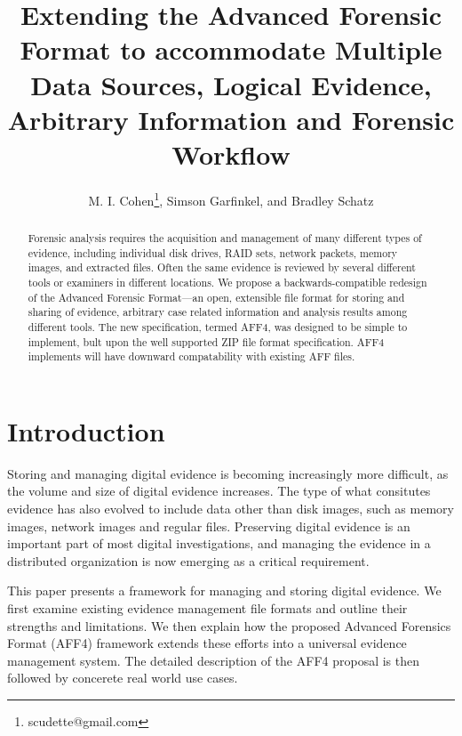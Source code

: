 \documentclass[10pt, conference]{IEEEtran}
\begin{document}
\title{Extending the Advanced Forensic Format to accommodate Multiple
  Data Sources, Logical Evidence, Arbitrary Information and Forensic Workflow}
\author{M. I. Cohen\footnote{scudette@gmail.com}, Simson Garfinkel, and Bradley Schatz}
\maketitle

\begin{abstract}
Forensic analysis requires the acquisition and management of many
different types of evidence, including individual disk drives, RAID
sets, network packets, memory images, and extracted files. Often the
same evidence is reviewed by several different tools or examiners in
different locations. We propose a backwards-compatible redesign of the
Advanced Forensic Format---an open, extensible file format for storing
and sharing of evidence, arbitrary case related information and
analysis results among different tools. The new specification, termed
AFF4, was designed to be simple to implement, bult upon the well
supported ZIP file format specification. AFF4 implements will have
downward compatability with existing AFF files.
\end{abstract}

\section{Introduction}
Storing and managing digital evidence is becoming increasingly more
difficult, as the volume and size of digital evidence increases. The
type of what consitutes evidence has also evolved to include data
other than disk images, such as memory images, network images and
regular files. Preserving digital evidence is an important part of
most digital investigations\cite{carrier:event-based}, and managing
the evidence in a distributed organization is now emerging as a
critical requirement.

This paper presents a framework for managing and storing digital
evidence. We first examine existing evidence management file formats
and outline their strengths and limitations. We then explain how the
proposed Advanced Forensics Format (AFF4) framework extends these
efforts into a universal evidence management system. The detailed
description of the AFF4 proposal is then followed by concerete real
world use cases.
\end{document}
